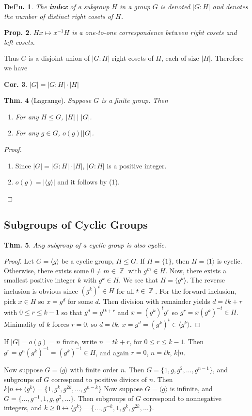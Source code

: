 \documentclass[12pt, a4paper]{book}
\DeclareMathOperator{\Z}{\mathbb{Z}}
\newtheorem{theorem}{Thm.}[section]
\newtheorem{definition}[theorem]{Def'n.}
\newtheorem{corollary}[theorem]{Cor.}
\newtheorem{proposition}[theorem]{Prop.}
\theoremstyle{nonumberplain}
\newtheorem{proof}{Proof}
\begin{document}
\begin{definition}
    The \textbf{index} of a subgroup $H$ in a group $G$ is denoted $|G:H|$ and denotes the number of distinct right cosets of $H$.
\end{definition}
\begin{proposition}
    $Hx\mapsto x^{-1}H$ is a one-to-one correspondence between right cosets and left cosets.
\end{proposition}
Thus $G$ is a disjoint union of $|G:H|$ right cosets of $H$, each of size $|H|$.
Therefore we have
\begin{corollary}
    $|G|=|G:H|\cdot|H|$
\end{corollary}
\begin{theorem}[Lagrange]
    Suppose $G$ is a finite group.
    Then
    \begin{enumerate}
        \item For any $H\leq G$, $|H|\mid|G|$.
        \item For any $g\in G$, $o(g)||G|$.
    \end{enumerate}
\end{theorem}
\begin{proof}
    \begin{enumerate}
        \item Since $|G|=|G:H|\cdot|H|$, $|G:H|$ is a positive integer.
        \item $o(g)=|\langle g\rangle|$ and it follows by (1).
    \end{enumerate}
\end{proof}
\subsection{Subgroups of Cyclic Groups}
\begin{theorem}
    Any subgroup of a cyclic group is also cyclic.
\end{theorem}
\begin{proof}
    Let $G=\langle g\rangle$ be a cyclic group, $H\leq G$.
    If $H=\{1\}$, then $H=\langle 1\rangle$ is cyclic.
    Otherwise, there exists some $0\neq m\in\Z$ with $g^m\in H$.
    Now, there exists a smallest positive integer $k$ with $g^k\in H$.
    We see that $H=\langle g^k\rangle$.
    The reverse inclusion is obvious since $(g^k)^t\in H$ for all $t\in\Z$.
    For the forward inclusion, pick $x\in H$ so $x=g^d$ for some $d$.
    Then division with remainder yields $d=tk+r$ with $0\leq r\leq k-1$ so that
    $g^d=g^{tk+r}$ and $x=(g^k)^tg^r$ so $g^r=x(g^k)^{-t}\in H$.
    Minimality of $k$ forces $r=0$, so $d=tk$, $x=g^d=(g^k)^t\in\langle g^k\rangle$.
\end{proof}
If $|G|=o(g)=n$ finite, write $n=tk+r$, for $0\leq r\leq k-1$.
Then $g^r=g^n(g^k)^{-t}=(g^k)^{-t}\in H$, and again $r=0$, $n=tk$, $k|n$.

Now suppose $G=\langle g\rangle$ with finite order $n$.
Then $G=\{1,g,g^2,\ldots,g^{n-1}\}$, and subgroups of $G$ correspond to positive diviors of $n$.
Then $k|n\leftrightarrow\langle g^k\rangle=\{1,g^k,g^{2k},\ldots,g^{n-k}\}$
Now suppose $G=\langle g\rangle$ is infinite, and $G=\{\ldots,g^{-1},1,g,g^2,\ldots\}$.
Then subgroups of $G$ correspond to nonnegative integers, and $k\geq 0\leftrightarrow \langle g^k\rangle=\{\ldots,g^{-k},1,g^k,g^{2k},\ldots\}$.
\end{document}
